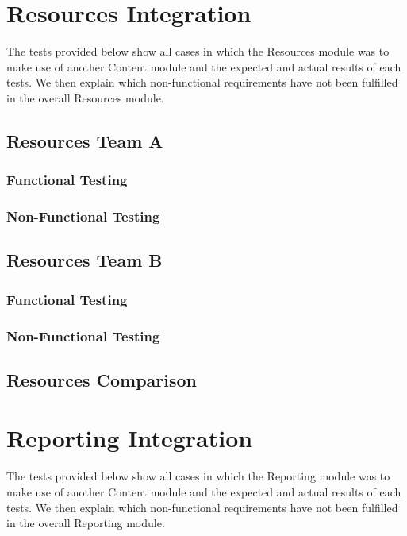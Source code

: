 \documentclass[12pt, oneside]{article}
\begin{document}
\newpage 
\section{Resources Integration}
The tests provided below show all cases in which the Resources module was to make use of another Content module and the expected and actual results of each tests. We then explain which non-functional requirements have not been fulfilled in the overall Resources module.
	\subsection{Resources Team A}	
		\subsubsection{Functional Testing}
			
		\subsubsection{Non-Functional Testing }
			
	
	\subsection{Resources Team B}	
		\subsubsection{Functional Testing}
			
		\subsubsection{Non-Functional Testing }
			
			
	
	\subsection{Resources Comparison}
	
	
\newpage 
\section{Reporting Integration}
The tests provided below show all cases in which the Reporting module was to make use of another Content module and the expected and actual results of each tests. We then explain which non-functional requirements have not been fulfilled in the overall Reporting module.
\end{document}
